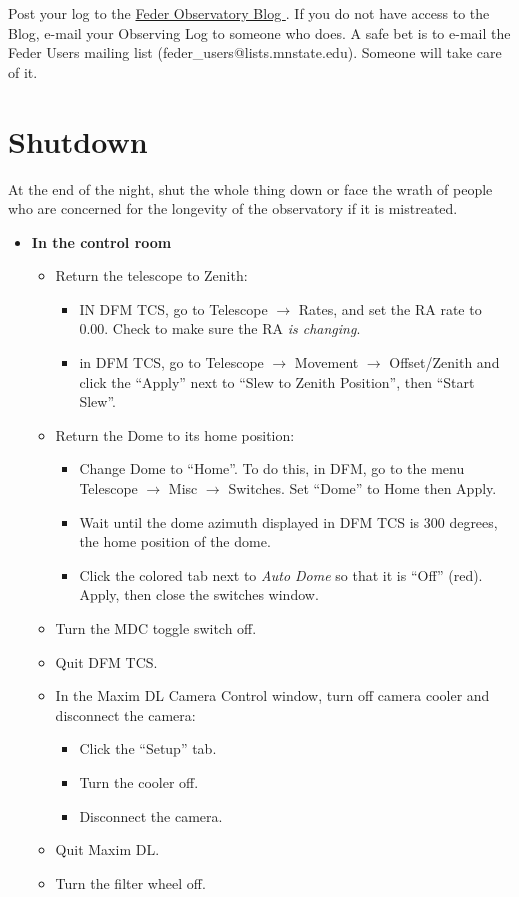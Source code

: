 \documentclass[letterpaper, 12pt]{report}
\begin{document}
Post your log to the \href{(http://astronomy.mnstate.edu/Feder_Observatory/}{Feder Observatory Blog }. If you do not have access to the Blog, e-mail your Observing Log to someone who does. A safe bet is to e-mail the Feder Users mailing list (feder\_users@lists.mnstate.edu). Someone will take care of it.

\newpage

\chapter{Shutdown}\label{ch:shutdown}
At the end of the night, shut the whole thing down or face the wrath of people who are concerned for the longevity of the observatory if it is mistreated.
\begin{itemize}
	\item {\large \textbf{In the control room}}
	\begin{itemize}
		\item Return the telescope to Zenith:
			\begin{itemize}
				\item IN DFM TCS, go to Telescope $\rightarrow$ Rates, and set the RA rate to 0.00. Check to make sure the RA \emph{is changing}.
				\item in DFM TCS, go to Telescope $\rightarrow$ Movement $\rightarrow$ Offset/Zenith and click the ``Apply'' next to ``Slew to Zenith Position'', then ``Start Slew''.
			\end{itemize}
		\item Return the Dome to its home position:
			\begin{itemize}
				\item Change Dome to ``Home''. To do this, in DFM, go to the menu Telescope $\rightarrow$ Misc $\rightarrow$ Switches. Set ``Dome'' to Home then Apply.
				\item Wait until the dome azimuth displayed in DFM TCS is 300 degrees, the home position of the dome.
				\item Click the colored tab next to \emph{Auto Dome} so that it is ``Off'' (red). Apply, then close the switches window.
			\end{itemize}
		\item Turn the MDC toggle switch off.
		\item Quit DFM TCS.
		\item In the Maxim DL Camera Control window, turn off camera cooler and disconnect the camera:
			\begin{itemize}
				\item Click the ``Setup'' tab.
				\item Turn the cooler off.
				\item Disconnect the camera.
			\end{itemize}
		\item Quit Maxim DL.
		\item Turn the filter wheel off.
	\end{itemize}


\end{itemize}
\end{document}
